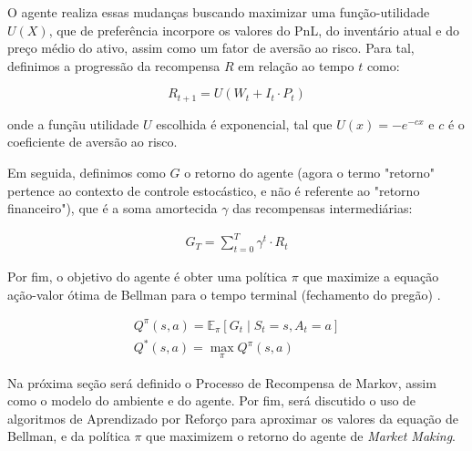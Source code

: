 O agente realiza essas mudanças buscando maximizar uma função-utilidade $U(X)$, que de preferência incorpore os valores do PnL, do inventário atual e do preço médio do ativo, assim como um fator de aversão ao risco. Para tal, definimos a progressão da recompensa $R$ em relação ao tempo $t$ como:

\[
R_{t + 1} = U(W_{t} + I_{t} \cdot P_{t})
\]

onde a funçãu utilidade $U$ escolhida é exponencial, tal que $U(x) = -e^{-c x}$ e $c$ é o coeficiente de aversão ao risco.

Em seguida, definimos como $G$ o retorno do agente (agora o termo "retorno" pertence ao contexto de controle estocástico, e não é referente ao "retorno financeiro"), que é a soma amortecida $\gamma$ das recompensas intermediárias:

\begin{equation}
	\begin{aligned}
		G_{T} = \sum_{t=0}^{T} \gamma^t \cdot R_t
	\end{aligned}
\end{equation}

Por fim, o objetivo do agente é obter uma política $\pi$ que maximize a equação ação-valor ótima de Bellman para o tempo terminal (fechamento do pregão) \citep{Sutton2018}.

\begin{equation}
	\begin{aligned}
		Q^{\pi}(s, a) = \mathbb{E}_{\pi} \left[ G_t \mid S_{t} = s, A_{t} = a \right]\\
		Q^{*}(s, a) = \max_{\pi} Q^{\pi}(s, a)		
	\end{aligned}
\end{equation}

Na próxima seção será definido o Processo de Recompensa de Markov, assim como o modelo do ambiente e do agente. Por fim, será discutido o uso de algoritmos de Aprendizado por Reforço para aproximar os valores da equação de Bellman, e da política $\pi$ que maximizem o retorno do agente de \textit{Market Making}.
